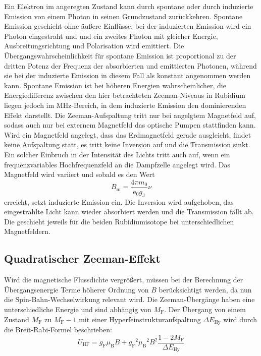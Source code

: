 Ein Elektron im angeregten Zustand kann durch spontane oder durch induzierte Emission von einem
Photon in seinen Grundzustand zurückkehren. Spontane Emission geschieht ohne äußere Einflüsse,
bei der induzierten Emission wird ein Photon eingestraht und und ein zweites Photon mit gleicher
Energie, Ausbreitungsrichtung und Polarisation wird emittiert.
Die Übergangswahrscheinlichkeit für spontane Emission ist proportional zu der dritten Potenz
der Frequenz der absorbierten und emittierten Photonen, während sie bei der induzierte Emission
in diesem Fall als konstant angenommen werden kann. Spontane Emission ist bei höheren Energien
wahrscheinlicher, die Energiedifferenz zwischen den hier betrachteten Zeeman-Niveaus in Rubidium
liegen jedoch im MHz-Bereich, in dem induzierte Emission den dominierenden Effekt darstellt.
Die Zeeman-Aufspaltung tritt nur bei angelgtem Magnetfeld auf, sodass auch nur bei externem
Magnetfeld das optische Pumpen stattfinden kann. Wird ein Magnetfeld angelegt, dass das
Erdmagnetfeld gerade ausgleicht, findet keine Aufspaltung statt, es tritt keine Inversion auf
und die Transmission sinkt. Ein solcher Einbruch in der Intensität des Lichts tritt
auch auf, wenn ein frequenzvariables Hochfrequenzfeld an die Dampfzelle angelegt wird. Das
Magnetfeld wird variiert und sobald es den Wert
\begin{equation}
  B_\text{m} = \frac{4\pi m_0}{\text{e}_0g_\text{J}}\nu
  \label{eq:ausgleich}
\end{equation}
erreicht, setzt induzierte Emission ein. Die Inversion wird aufgehoben, das eingestrahlte Licht
kann wieder absorbiert werden und die Transmission fällt ab. Die geschieht jeweils für die
beiden Rubidiumisotope bei unterschiedlichen Magnetfeldern.

\subsection{Quadratischer Zeeman-Effekt}

Wird die magnetische Flussdichte vergrößert, müssen bei der Berechnung der Übergangsenergie Terme höherer Ordnung von $B$
berücksichtigt werden, da nun die Spin-Bahn-Wechselwirkung relevant wird. Die Zeeman-Übergänge haben eine unterschiedliche
Energie und sind abhängig von $M_\text{F}$. Der Übergang von einem Zustand $M_\text{F}$ zu $M_\text{F}-1$ mit einer
Hyperfeinstrukturaufspaltung $\Delta E_\text{Hy}$ wird durch die Breit-Rabi-Formel beschrieben:
\begin{equation}
  U_\text{HF} = g_\text{F}\mu_\text{B}B + {g_\text{F}}^2{\mu_\text{B}}^2B^2\frac{1-2M_\text{F}}{\Delta E_\text{Hy}}
  \label{eq:qze}
\end{equation}

